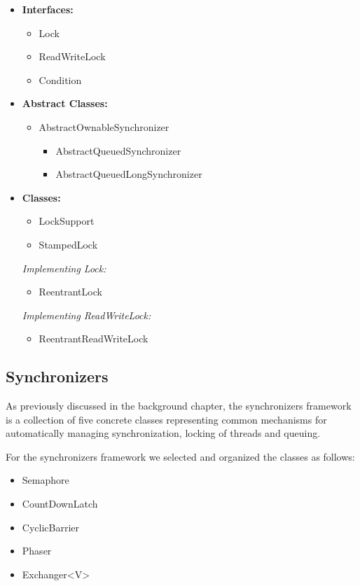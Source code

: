 \documentclass[]{usiinfthesis}
\begin{document}
\begin{itemize}
    \item \textbf{Interfaces:}
    \begin{itemize}
        \item Lock
        \item ReadWriteLock
        \item Condition
    \end{itemize}
    \item \textbf{Abstract Classes:}
    \begin{itemize}
        \item AbstractOwnableSynchronizer
        \begin{itemize}
            \item AbstractQueuedSynchronizer
            \item AbstractQueuedLongSynchronizer
        \end{itemize}
    \end{itemize}
    \item \textbf{Classes:}
    \begin{itemize}    
        \item LockSupport
        \item StampedLock
    \end{itemize}
    \textit{Implementing Lock:}
    \begin{itemize}
        \item ReentrantLock
    \end{itemize}
    \textit{Implementing ReadWriteLock:}
    \begin{itemize}
        \item ReentrantReadWriteLock
    \end{itemize}
\end{itemize}

\subsection{Synchronizers}
As previously discussed in the background chapter, the synchronizers framework is a collection of five concrete classes representing common mechanisms for automatically managing synchronization, locking of threads and queuing.

\noindent
For the synchronizers framework we selected and organized the classes as follows:

\begin{itemize}
    \item Semaphore
    \item CountDownLatch
    \item CyclicBarrier
    \item Phaser
    \item Exchanger<V>
\end{itemize}
\end{document}
